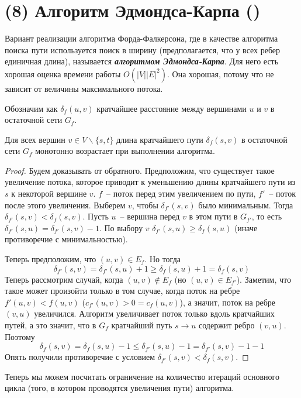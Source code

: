 \let\bf\bfseries
\let\it\itshape
\section{(8) Алгоритм Эдмондса-Карпа (\groth)}\label{edmonds_karp}
Вариант реализации алгоритма Форда-Фалкерсона, где в качестве алгоритма поиска пути используется поиск в ширину (предполагается, что у всех ребер единичная длина), называется {\bf\it алгоритмом Эдмондса-Карпа}. Для него есть хорошая оценка времени работы $O(|V||E|^2)$. Она хорошая, потому что не зависит от величины максимального потока.

Обозначим как $\delta_f(u,v)$ кратчайшее расстояние между вершинами $u$ и $v$ в остаточной сети $G_f$.
\begin{lemma}\label{someshit5}
	Для всех вершин $v\in V\smallsetminus\{s,t\}$ длина кратчайшего пути $\delta_f(s,v)$ в остаточной сети $G_f$ монотонно возрастает при выполнении алгоритма.
\end{lemma}
\begin{proof}
	Будем доказывать от обратного. Предположим, что существует такое увеличение потока, которое приводит к уменьшению длины кратчайшего пути из $s$ к некоторой вершине $v$. $f$~-- поток перед этим увеличением по пути, $f'$~-- поток после этого увеличения. Выберем $v$, чтобы $\delta_{f'}(s,v)$ было минимальным. Тогда $\delta_{f'}(s,v)<\delta_f(s,v)$. Пусть $u$~-- вершина перед $v$ в этом пути в $G_{f'}$, то есть $\delta_{f'}(s,u)=\delta_{f'}(s,v)-1$. По выбору $v$ $\delta_{f'}(s,u)\ge\delta_f(s,u)$ (иначе противоречие с минимальностью). 
	
	Теперь предположим, что $(u,v)\in E_f$. Но тогда $$\delta_{f'}(s,v)=\delta_{f'}(s,u)+1\ge\delta_f(s,u)+1=\delta_f(s,v)$$
	Теперь рассмотрим случай, когда $(u,v)\not\in E_f$ (но $(u,v)\in E_{f'}$). Заметим, что такое может произойти только в том случае, когда поток на ребре $f'(u,v)<f(u,v)$ ($c_{f'}(u,v)>0=c_f(u,v)$), а значит, поток на ребре $(v,u)$ увеличился. Алгоритм увеличивает поток только вдоль кратчайших путей, а это значит, что в $G_f$ кратчайший путь $s\to u$ содержит ребро $(v,u)$. Поэтому $$\delta_f(s,v)=\delta_f(s,u)-1\le\delta_{f'}(s,u)-1=\delta_{f'}(s,v)-1-1$$
	Опять получили противоречие с условием $\delta_{f'}(s,v)<\delta_f(s,v)$.
\end{proof}

Теперь мы можем посчитать ограничение на количество итераций основного цикла (того, в котором проводятся увеличения пути) алгоритма.


